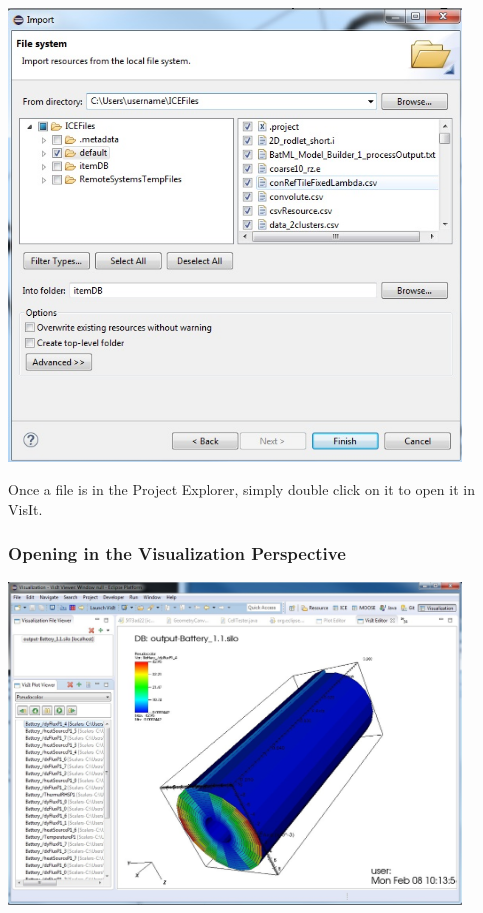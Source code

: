 \documentclass{article}
\begin{document}
\begin{center}
\includegraphics[width=12cm]{images/ImportFileDialog}
\end{center}

Once a file is in the Project Explorer, simply double click on it to open it in
VisIt.

\subsubsection{Opening in the Visualization Perspective}

\begin{center}
\includegraphics[width=12cm]{images/VisualizationPerspectiveOverview}
\end{center}
\end{document}
